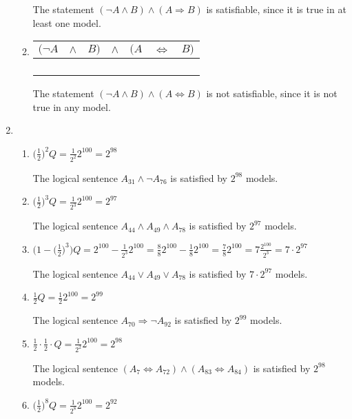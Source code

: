 \begin{enumerate}
\begin{enumerate}
The statement $(\neg A \land B) \land (A \Rightarrow B)$ is satisfiable, since it is true in at least one model.
\item
\begin{tabular}{ccc|c|ccc}
$(\neg A$ & $\land$ & $B)$ & $\land$ & $(A$ & $\Leftrightarrow$ & $B)$\\
\hline
\T        & \F      & \F   & \F      & \F   & \T            & \F  \\
\T        & \T      & \T   & \F      & \F   & \F            & \T  \\
\F        & \F      & \F   & \F      & \T   & \F            & \F  \\
\F        & \F      & \T   & \F      & \T   & \T            & \T  \\
\end{tabular}

The statement $(\neg A \land B) \land (A \Leftrightarrow B)$ is not satisfiable, since it is not true in any model.
\end{enumerate}
\item
\begin{enumerate}
\item $\big(\frac{1}{2}\big)^2 Q = \frac{1}{2^2} 2^{100} = 2^{98}$

The logical sentence $A_{31} \land \neg A_{76}$ is satisfied by $2^{98}$ models.
\item $\big(\frac{1}{2}\big)^3 Q = \frac{1}{2^3} 2^{100} = 2^{97}$

The logical sentence $A_{44} \land A_{49} \land A_{78}$ is satisfied by $2^{97}$ models.
\item $\Big(1 - \big(\frac{1}{2}\big)^3\Big) Q = 2^{100} - \frac{1}{2^3} 2^{100} = \frac{8}{8} 2^{100} - \frac{1}{8} 2^{100} = \frac{7}{8} 2^{100} = 7 \frac{2^{100}}{2^3} = 7 \cdot 2^{97}$

The logical sentence $A_{44} \lor A_{49} \lor A_{78}$ is satisfied by $7 \cdot 2^{97}$ models.
\item $\frac{1}{2} Q = \frac{1}{2} 2^{100} = 2^{99}$

The logical sentence $A_{70} \Rightarrow \neg A_{92}$ is satisfied by $2^{99}$ models.
\item $\frac{1}{2} \cdot \frac{1}{2} \cdot Q = \frac{1}{2^2} 2^{100} = 2^{98}$

The logical sentence $(A_7 \Leftrightarrow A_{72}) \land (A_{83} \Leftrightarrow A_{84})$ is satisfied by $2^{98}$ models.
\item $\big(\frac{1}{2}\big)^8 Q = \frac{1}{2^8} 2^{100} = 2^{92}$


\end{enumerate}
\end{enumerate}
